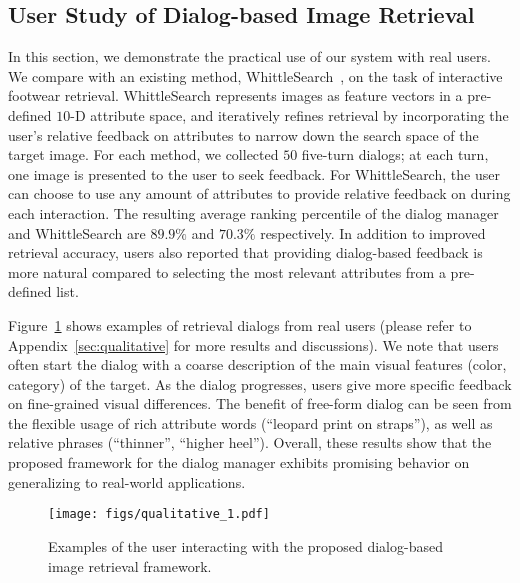 \subsection{User Study of Dialog-based Image Retrieval}
\label{sec:humanResult}
In this section, we demonstrate the practical use of our system 
with real users. We compare with an existing method, WhittleSearch~\cite{kovashka2012}, on the task of interactive footwear retrieval.  WhittleSearch represents images as feature 
vectors in a pre-defined $10$-D attribute space, and iteratively refines 
retrieval by incorporating the user's relative feedback on 
attributes to narrow down the search space of the target 
image. For each method, we collected $50$ five-turn dialogs; 
at each turn, one image is presented to the user to seek feedback. 
For WhittleSearch, the user can choose to use
any amount of attributes to provide relative feedback on during each
interaction. The resulting average ranking percentile of the dialog manager and 
WhittleSearch are $89.9\%$ and $70.3\%$ 
respectively. In addition to improved retrieval accuracy, users also 
reported that providing dialog-based feedback is more natural compared to selecting
the most relevant attributes from a pre-defined list.

Figure~\ref{fig:userDialogs} shows examples of retrieval dialogs from real users
(please refer to Appendix~\ref{sec:qualitative} for more results and discussions). 
We note that users often start the dialog with a coarse description of the main
visual features (color, category) of the target. As the dialog progresses, 
users give more specific feedback on fine-grained visual differences. 
The benefit of free-form dialog can be seen from the
flexible usage of rich attribute words (``leopard print on straps''),
as well as relative phrases (``thinner'', ``higher heel'').
Overall, these results show that the proposed framework for the
dialog manager exhibits promising behavior on generalizing to real-world applications. 
 
\begin{figure}
\centering
\texttt{[image: figs/qualitative\_1.pdf]} 
\caption{Examples of the user interacting with the proposed dialog-based 
image retrieval framework. }
\label{fig:userDialogs}
\vspace{-1em}
\end{figure}

